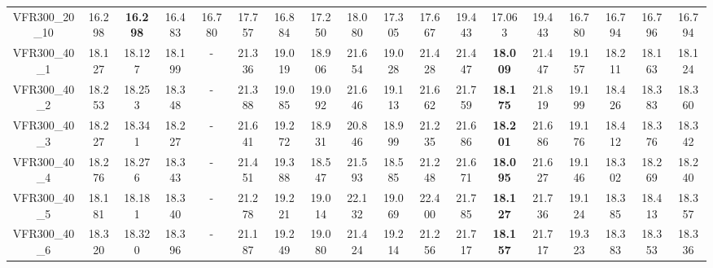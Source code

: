 \begin{tabular}{cc|ccc|ccccccccccccc}
VFR300\_20\_10     & 16.298           & {\bf 16.298}     & 16.483           & 16.780           & 17.757           & 16.884           & 17.250           & 18.080           & 17.305           & 17.667           & 19.443           & 17.063           & 19.443           & 16.780           & 16.794           & 16.796           & 16.794          \\ 
VFR300\_40\_1      & 18.127           & 18.127           & 18.199           & -                & 21.336           & 19.019           & 18.906           & 21.654           & 19.028           & 21.428           & 21.447           & {\bf 18.009}     & 21.447           & 19.157           & 18.211           & 18.163           & 18.124          \\ 
VFR300\_40\_2      & 18.253           & 18.253           & 18.348           & -                & 21.388           & 19.085           & 19.092           & 21.646           & 19.113           & 21.662           & 21.759           & {\bf 18.175}     & 21.819           & 19.199           & 18.426           & 18.383           & 18.360          \\ 
VFR300\_40\_3      & 18.227           & 18.341           & 18.227           & -                & 21.641           & 19.272           & 18.931           & 20.846           & 18.999           & 21.235           & 21.686           & {\bf 18.201}     & 21.686           & 19.176           & 18.412           & 18.376           & 18.342          \\ 
VFR300\_40\_4      & 18.276           & 18.276           & 18.343           & -                & 21.451           & 19.388           & 18.547           & 21.593           & 18.585           & 21.248           & 21.671           & {\bf 18.095}     & 21.627           & 19.146           & 18.302           & 18.269           & 18.240          \\ 
VFR300\_40\_5      & 18.181           & 18.181           & 18.340           & -                & 21.278           & 19.221           & 19.014           & 22.132           & 19.069           & 22.400           & 21.785           & {\bf 18.127}     & 21.736           & 19.124           & 18.385           & 18.413           & 18.357          \\ 
VFR300\_40\_6      & 18.320           & 18.320           & 18.396           & -                & 21.187           & 19.249           & 19.080           & 21.424           & 19.214           & 21.256           & 21.717           & {\bf 18.157}     & 21.717           & 19.323           & 18.383           & 18.353           & 18.336          \\ 

\end{tabular}
